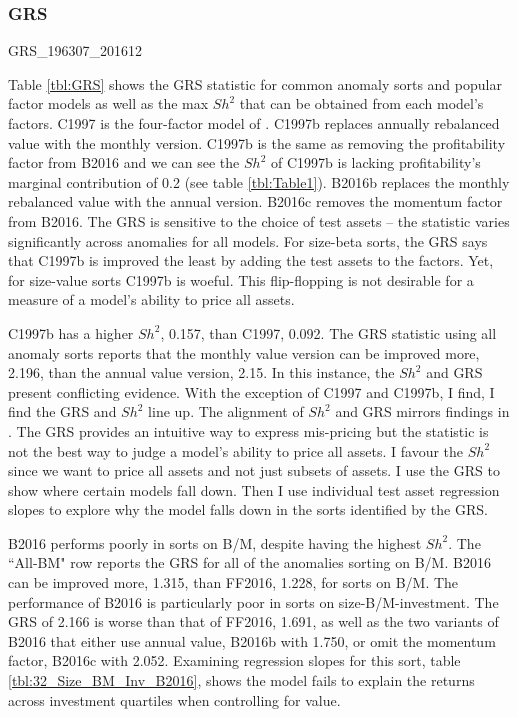 
\subsubsection{GRS}

{GRS_196307_201612}

Table \ref{tbl:GRS} shows the GRS statistic for common anomaly sorts and popular factor
models as well as the max $Sh^2$ that can be obtained from each model's factors. C1997 is
the four-factor model of \textcite{carhart1997persistence}. C1997b replaces annually
rebalanced value with the monthly version. C1997b is the same as removing the
profitability factor from B2016 and we can see the $Sh^2$ of C1997b is lacking
profitability's marginal contribution of 0.2 (see table \ref{tbl:Table1}). B2016b replaces
the monthly rebalanced value with the annual version. B2016c removes the momentum factor
from B2016. The GRS is sensitive to the choice of test assets -- the statistic varies
significantly across anomalies for all models. For size-beta sorts, the GRS says that
C1997b is improved the least by adding the test assets to the factors. Yet, for size-value
sorts C1997b is woeful. This flip-flopping is not desirable for a measure of a model's
ability to price all assets.

C1997b has a higher $Sh^2$, 0.157, than C1997, 0.092. The GRS statistic using all anomaly
sorts reports that the monthly value version can be improved more, 2.196, than the annual
value version, 2.15. In this instance, the $Sh^2$ and GRS present conflicting evidence.
With the exception of C1997 and C1997b, I find, I find the GRS and $Sh^2$ line up. The
alignment of $Sh^2$ and GRS mirrors findings in \textcite{fama2016choosing}. The GRS
provides an intuitive way to express mis-pricing but the statistic is not the best way to
judge a model's ability to price all assets. I favour the $Sh^2$ since we want to price
all assets and not just subsets of assets. I use the GRS to show where certain models fall
down. Then I use individual test asset regression slopes to explore why the model falls
down in the sorts identified by the GRS.

B2016 performs poorly in sorts on B/M, despite having the highest $Sh^2$. The ``All-BM"
row reports the GRS for all of the anomalies sorting on B/M. B2016 can be improved more,
1.315, than FF2016, 1.228, for sorts on B/M. The performance of B2016 is particularly poor
in sorts on size-B/M-investment. The GRS of 2.166 is worse than that of FF2016, 1.691, as
well as the two variants of B2016 that either use annual value, B2016b with 1.750, or omit
the momentum factor, B2016c with 2.052. Examining regression slopes for this sort, table
\ref{tbl:32_Size_BM_Inv_B2016}, shows the model fails to explain the returns across
investment quartiles when controlling for value.

